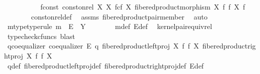 \begin{isabellebody}
\ \ \ \ \isanewline
\ \ \ \ \isamarkupfalse%
\ f{\isacharunderscore}{\kern0pt}const{\isacharcolon}{\kern0pt}\ {\isachardoublequoteopen}const{\isacharunderscore}{\kern0pt}on{\isacharunderscore}{\kern0pt}rel\ X\ {\isacharparenleft}{\kern0pt}X\ \isactrlbsub f\isactrlesub {\isasymtimes}\isactrlsub c\isactrlbsub f\isactrlesub \ X{\isacharcomma}{\kern0pt}\ fibered{\isacharunderscore}{\kern0pt}product{\isacharunderscore}{\kern0pt}morphism\ X\ f\ f\ X{\isacharparenright}{\kern0pt}\ f{\isachardoublequoteclose}\isanewline
\ \ \ \ \ \ \isamarkupfalse%
\ const{\isacharunderscore}{\kern0pt}on{\isacharunderscore}{\kern0pt}rel{\isacharunderscore}{\kern0pt}def\ \isamarkupfalse%
\ assms\ fibered{\isacharunderscore}{\kern0pt}product{\isacharunderscore}{\kern0pt}pair{\isacharunderscore}{\kern0pt}member\ \isamarkupfalse%
\ auto\isanewline
\ \ \ \ \isamarkupfalse%
\ \isamarkupfalse%
\ m{\isacharunderscore}{\kern0pt}type{\isacharbrackleft}{\kern0pt}type{\isacharunderscore}{\kern0pt}rule{\isacharbrackright}{\kern0pt}{\isacharcolon}{\kern0pt}\ {\isachardoublequoteopen}m\ {\isacharcolon}{\kern0pt}\ E\ {\isasymrightarrow}\ Y{\isachardoublequoteclose}\isanewline
\ \ \ \ \ \ \isamarkupfalse%
\ m{\isacharunderscore}{\kern0pt}def\ E{\isacharunderscore}{\kern0pt}def\ \isamarkupfalse%
\ kernel{\isacharunderscore}{\kern0pt}pair{\isacharunderscore}{\kern0pt}equiv{\isacharunderscore}{\kern0pt}rel\ \isamarkupfalse%
\ {\isacharparenleft}{\kern0pt}typecheck{\isacharunderscore}{\kern0pt}cfuncs{\isacharcomma}{\kern0pt}\ blast{\isacharparenright}{\kern0pt}\isanewline
\ \ \ \ \isanewline
\ \ \ \ \isamarkupfalse%
\ q{\isacharunderscore}{\kern0pt}coequalizer{\isacharcolon}{\kern0pt}\ {\isachardoublequoteopen}coequalizer\ E\ q\ {\isacharparenleft}{\kern0pt}fibered{\isacharunderscore}{\kern0pt}product{\isacharunderscore}{\kern0pt}left{\isacharunderscore}{\kern0pt}proj\ X\ f\ f\ X{\isacharparenright}{\kern0pt}\ {\isacharparenleft}{\kern0pt}fibered{\isacharunderscore}{\kern0pt}product{\isacharunderscore}{\kern0pt}right{\isacharunderscore}{\kern0pt}proj\ X\ f\ f\ X{\isacharparenright}{\kern0pt}{\isachardoublequoteclose}\isanewline
\ \ \ \ \ \ \isamarkupfalse%
\ q{\isacharunderscore}{\kern0pt}def\ fibered{\isacharunderscore}{\kern0pt}product{\isacharunderscore}{\kern0pt}left{\isacharunderscore}{\kern0pt}proj{\isacharunderscore}{\kern0pt}def\ fibered{\isacharunderscore}{\kern0pt}product{\isacharunderscore}{\kern0pt}right{\isacharunderscore}{\kern0pt}proj{\isacharunderscore}{\kern0pt}def\ E{\isacharunderscore}{\kern0pt}def\isanewline

\end{isabellebody}
